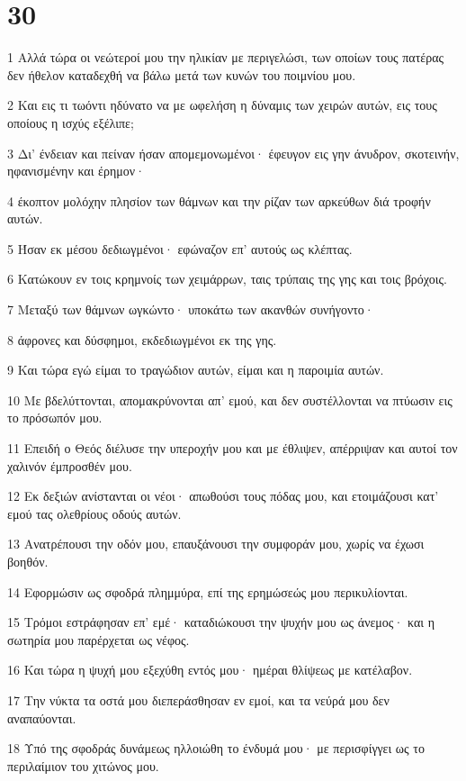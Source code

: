 \chapter{30}

\par 1 Αλλά τώρα οι νεώτεροί μου την ηλικίαν με περιγελώσι, των οποίων τους πατέρας δεν ήθελον καταδεχθή να βάλω μετά των κυνών του ποιμνίου μου.
\par 2 Και εις τι τωόντι ηδύνατο να με ωφελήση η δύναμις των χειρών αυτών, εις τους οποίους η ισχύς εξέλιπε;
\par 3 Δι' ένδειαν και πείναν ήσαν απομεμονωμένοι· έφευγον εις γην άνυδρον, σκοτεινήν, ηφανισμένην και έρημον·
\par 4 έκοπτον μολόχην πλησίον των θάμνων και την ρίζαν των αρκεύθων διά τροφήν αυτών.
\par 5 Ήσαν εκ μέσου δεδιωγμένοι· εφώναζον επ' αυτούς ως κλέπτας.
\par 6 Κατώκουν εν τοις κρημνοίς των χειμάρρων, ταις τρύπαις της γης και τοις βρόχοις.
\par 7 Μεταξύ των θάμνων ωγκώντο· υποκάτω των ακανθών συνήγοντο·
\par 8 άφρονες και δύσφημοι, εκδεδιωγμένοι εκ της γης.
\par 9 Και τώρα εγώ είμαι το τραγώδιον αυτών, είμαι και η παροιμία αυτών.
\par 10 Με βδελύττονται, απομακρύνονται απ' εμού, και δεν συστέλλονται να πτύωσιν εις το πρόσωπόν μου.
\par 11 Επειδή ο Θεός διέλυσε την υπεροχήν μου και με έθλιψεν, απέρριψαν και αυτοί τον χαλινόν έμπροσθέν μου.
\par 12 Εκ δεξιών ανίστανται οι νέοι· απωθούσι τους πόδας μου, και ετοιμάζουσι κατ' εμού τας ολεθρίους οδούς αυτών.
\par 13 Ανατρέπουσι την οδόν μου, επαυξάνουσι την συμφοράν μου, χωρίς να έχωσι βοηθόν.
\par 14 Εφορμώσιν ως σφοδρά πλημμύρα, επί της ερημώσεώς μου περικυλίονται.
\par 15 Τρόμοι εστράφησαν επ' εμέ· καταδιώκουσι την ψυχήν μου ως άνεμος· και η σωτηρία μου παρέρχεται ως νέφος.
\par 16 Και τώρα η ψυχή μου εξεχύθη εντός μου· ημέραι θλίψεως με κατέλαβον.
\par 17 Την νύκτα τα οστά μου διεπεράσθησαν εν εμοί, και τα νεύρά μου δεν αναπαύονται.
\par 18 Υπό της σφοδράς δυνάμεως ηλλοιώθη το ένδυμά μου· με περισφίγγει ως το περιλαίμιον του χιτώνος μου.
